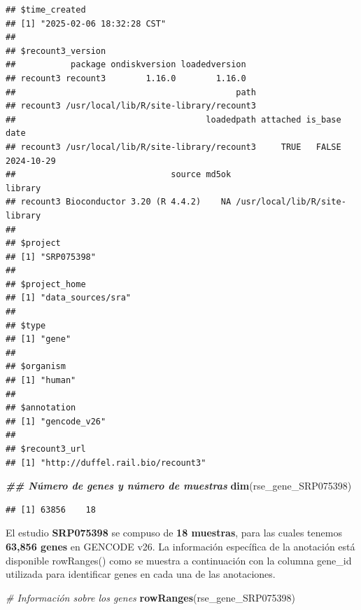 \documentclass[
]{article}
\newenvironment{Shaded}{\begin{snugshade}}{\end{snugshade}}
\newcommand{\CommentTok}[1]{\textcolor[rgb]{0.56,0.35,0.01}{\textit{#1}}}
\newcommand{\DocumentationTok}[1]{\textcolor[rgb]{0.56,0.35,0.01}{\textbf{\textit{#1}}}}
\newcommand{\FunctionTok}[1]{\textcolor[rgb]{0.13,0.29,0.53}{\textbf{#1}}}
\newcommand{\NormalTok}[1]{#1}
\begin{document}
\begin{verbatim}
## $time_created
## [1] "2025-02-06 18:32:28 CST"
## 
## $recount3_version
##           package ondiskversion loadedversion
## recount3 recount3        1.16.0        1.16.0
##                                            path
## recount3 /usr/local/lib/R/site-library/recount3
##                                      loadedpath attached is_base       date
## recount3 /usr/local/lib/R/site-library/recount3     TRUE   FALSE 2024-10-29
##                               source md5ok                       library
## recount3 Bioconductor 3.20 (R 4.4.2)    NA /usr/local/lib/R/site-library
## 
## $project
## [1] "SRP075398"
## 
## $project_home
## [1] "data_sources/sra"
## 
## $type
## [1] "gene"
## 
## $organism
## [1] "human"
## 
## $annotation
## [1] "gencode_v26"
## 
## $recount3_url
## [1] "http://duffel.rail.bio/recount3"
\end{verbatim}

\begin{Shaded}
\begin{Highlighting}[]
\DocumentationTok{\#\# Número de genes y número de muestras}
\FunctionTok{dim}\NormalTok{(rse\_gene\_SRP075398)}
\end{Highlighting}
\end{Shaded}

\begin{verbatim}
## [1] 63856    18
\end{verbatim}

El estudio \textbf{SRP075398} se compuso de \textbf{18 muestras}, para
las cuales tenemos \textbf{63,856 genes} en GENCODE v26. La información
específica de la anotación está disponible rowRanges() como se muestra a
continuación con la columna gene\_id utilizada para identificar genes en
cada una de las anotaciones.

\begin{Shaded}
\begin{Highlighting}[]
\CommentTok{\# Información sobre los genes}
\FunctionTok{rowRanges}\NormalTok{(rse\_gene\_SRP075398)}
\end{Highlighting}
\end{Shaded}
\end{document}
